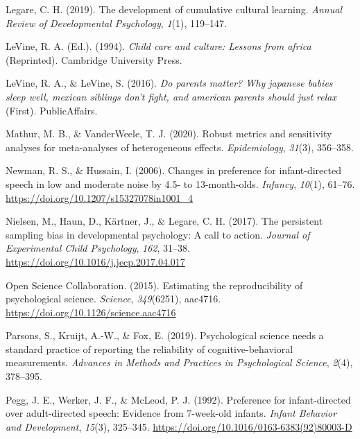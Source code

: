 \documentclass[
  ,man,floatsintext]{apa6}
\newlength{\cslhangindent}
\newlength{\cslentryspacingunit} %
\newenvironment{CSLReferences}[2] %
 {%
  \setlength{\parindent}{0pt}
  \ifodd #1
  \let\oldpar\par
  \def\par{\hangindent=\cslhangindent\oldpar}
  \fi
  \setlength{\parskip}{#2\cslentryspacingunit}
 }%
 {}
\begin{document}
\begin{CSLReferences}{1}{0}
\leavevmode{}%
Legare, C. H. (2019). The development of cumulative cultural learning. \emph{Annual Review of Developmental Psychology}, \emph{1}(1), 119--147.

\leavevmode{}%
LeVine, R. A. (Ed.). (1994). \emph{Child care and culture: Lessons from africa} (Reprinted). Cambridge University Press.

\leavevmode{}%
LeVine, R. A., \& LeVine, S. (2016). \emph{Do parents matter? Why japanese babies sleep well, mexican siblings don't fight, and american parents should just relax} (First). PublicAffairs.

\leavevmode{}%
Mathur, M. B., \& VanderWeele, T. J. (2020). Robust metrics and sensitivity analyses for meta-analyses of heterogeneous effects. \emph{Epidemiology}, \emph{31}(3), 356--358.

\leavevmode{}%
Newman, R. S., \& Hussain, I. (2006). Changes in preference for infant-directed speech in low and moderate noise by 4.5- to 13-month-olds. \emph{Infancy}, \emph{10}(1), 61--76. \url{https://doi.org/10.1207/s15327078in1001_4}

\leavevmode{}%
Nielsen, M., Haun, D., Kärtner, J., \& Legare, C. H. (2017). The persistent sampling bias in developmental psychology: A call to action. \emph{Journal of Experimental Child Psychology}, \emph{162}, 31--38. \url{https://doi.org/10.1016/j.jecp.2017.04.017}

\leavevmode{}%
Open Science Collaboration. (2015). Estimating the reproducibility of psychological science. \emph{Science}, \emph{349}(6251), aac4716. \url{https://doi.org/10.1126/science.aac4716}

\leavevmode{}%
Parsons, S., Kruijt, A.-W., \& Fox, E. (2019). Psychological science needs a standard practice of reporting the reliability of cognitive-behavioral measurements. \emph{Advances in Methods and Practices in Psychological Science}, \emph{2}(4), 378--395.

\leavevmode{}%
Pegg, J. E., Werker, J. F., \& McLeod, P. J. (1992). Preference for infant-directed over adult-directed speech: Evidence from 7-week-old infants. \emph{Infant Behavior and Development}, \emph{15}(3), 325--345. \url{https://doi.org/10.1016/0163-6383(92)80003-D}


\end{CSLReferences}
\end{document}
